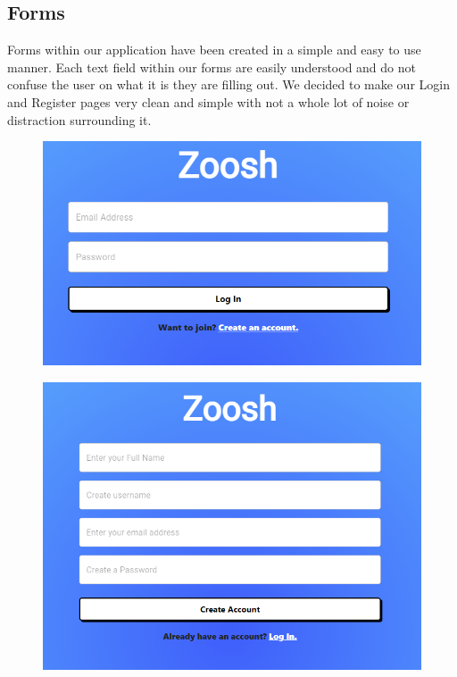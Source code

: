 \subsection{Forms}
Forms within our application have been created in a simple and easy to use manner. Each text field within our forms are easily understood and do not confuse the user on what it is they are filling out. We decided to make our Login and Register pages very clean and simple with not a whole lot of noise or distraction surrounding it. 

\begin{figure}[H]
  \centering
  \includegraphics[scale=0.45]{img/login.PNG}
  \label{fig:Login Screen}
\end{figure}

\begin{figure}[H]
  \centering
  \includegraphics[scale=0.45]{img/join.PNG}
  \label{fig:Join Screen}
\end{figure}

